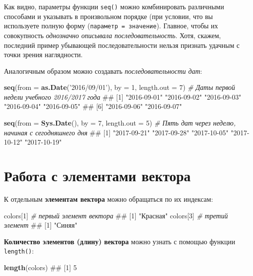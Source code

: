 \documentclass[]{book}
\newenvironment{Shaded}{\begin{snugshade}}{\end{snugshade}}
\newcommand{\KeywordTok}[1]{\textcolor[rgb]{0.13,0.29,0.53}{\textbf{#1}}}
\newcommand{\DataTypeTok}[1]{\textcolor[rgb]{0.13,0.29,0.53}{#1}}
\newcommand{\DecValTok}[1]{\textcolor[rgb]{0.00,0.00,0.81}{#1}}
\newcommand{\StringTok}[1]{\textcolor[rgb]{0.31,0.60,0.02}{#1}}
\newcommand{\CommentTok}[1]{\textcolor[rgb]{0.56,0.35,0.01}{\textit{#1}}}
\newcommand{\NormalTok}[1]{#1}
\begin{document}
Как видно, параметры функции \texttt{seq()} можно комбинировать
различными способами и указывать в произвольном порядке (при условии,
что вы используете полную форму (\texttt{параметр\ =\ значение}).
Главное, чтобы их совокупность \emph{однозначно описывала
последовательность}. Хотя, скажем, последний пример убывающей
последовательности нельзя признать удачным с точки зрения наглядности.

Аналогичным образом можно создавать \emph{последовательности дат}:

\begin{Shaded}
\begin{Highlighting}[]
\KeywordTok{seq}\NormalTok{(}\DataTypeTok{from =} \KeywordTok{as.Date}\NormalTok{(}\StringTok{'2016/09/01'}\NormalTok{), }\DataTypeTok{by =} \DecValTok{1}\NormalTok{, }\DataTypeTok{length.out =} \DecValTok{7}\NormalTok{) }\CommentTok{# Даты первой недели учебного 2016/2017 года}
\NormalTok{## [1] "2016-09-01" "2016-09-02" "2016-09-03" "2016-09-04" "2016-09-05"}
\NormalTok{## [6] "2016-09-06" "2016-09-07"}

\KeywordTok{seq}\NormalTok{(}\DataTypeTok{from =} \KeywordTok{Sys.Date}\NormalTok{(), }\DataTypeTok{by =} \DecValTok{7}\NormalTok{, }\DataTypeTok{length.out =} \DecValTok{5}\NormalTok{) }\CommentTok{# Пять дат через неделю, начиная с сегодняшнего дня}
\NormalTok{## [1] "2017-09-21" "2017-09-28" "2017-10-05" "2017-10-12" "2017-10-19"}
\end{Highlighting}
\end{Shaded}

\section{Работа с элементами вектора}\label{vector_elements}

К отдельным \textbf{элементам вектора} можно обращаться по их индексам:

\begin{Shaded}
\begin{Highlighting}[]
\NormalTok{colors[}\DecValTok{1}\NormalTok{] }\CommentTok{# первый элемент вектора}
\NormalTok{## [1] "Красная"}
\NormalTok{colors[}\DecValTok{3}\NormalTok{] }\CommentTok{# третий элемент}
\NormalTok{## [1] "Синяя"}
\end{Highlighting}
\end{Shaded}

\textbf{Количество элементов (длину) вектора} можно узнать с помощью
функции \texttt{length()}:

\begin{Shaded}
\begin{Highlighting}[]
\KeywordTok{length}\NormalTok{(colors)}
\NormalTok{## [1] 5}
\end{Highlighting}
\end{Shaded}
\end{document}
